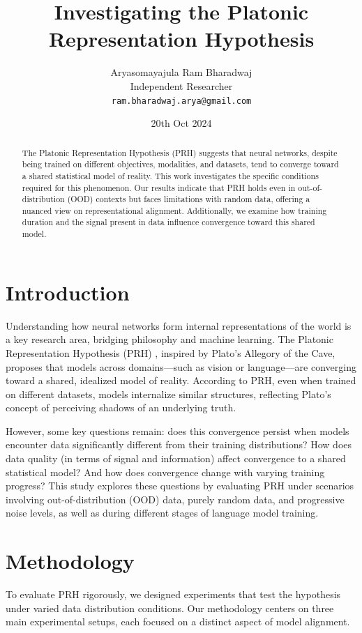 \documentclass[10pt,a4paper]{article}
\title{Investigating the Platonic Representation Hypothesis}
\author{Aryasomayajula Ram Bharadwaj\\
Independent Researcher\\
\texttt{ram.bharadwaj.arya@gmail.com}}
\date{20th Oct 2024}
\begin{document}
\maketitle

\begin{abstract}
The Platonic Representation Hypothesis (PRH) \cite{huh2024prh} suggests that neural networks, despite being trained on different objectives, modalities, and datasets, tend to converge toward a shared statistical model of reality. This work investigates the specific conditions required for this phenomenon. Our results indicate that PRH holds even in out-of-distribution (OOD) contexts but faces limitations with random data, offering a nuanced view on representational alignment. Additionally, we examine how training duration and the signal present in data influence convergence toward this shared model.
\end{abstract}

\section{Introduction}
Understanding how neural networks form internal representations of the world is a key research area, bridging philosophy and machine learning. The Platonic Representation Hypothesis (PRH) \cite{huh2024prh}, inspired by Plato’s Allegory of the Cave, proposes that models across domains—such as vision or language—are converging toward a shared, idealized model of reality. According to PRH, even when trained on different datasets, models internalize similar structures, reflecting Plato’s concept of perceiving shadows of an underlying truth.

However, some key questions remain: does this convergence persist when models encounter data significantly different from their training distributions? How does data quality (in terms of signal and information) affect convergence to a shared statistical model? And how does convergence change with varying training progress? This study explores these questions by evaluating PRH under scenarios involving out-of-distribution (OOD) data, purely random data, and progressive noise levels, as well as during different stages of language model training.

\section{Methodology}
To evaluate PRH rigorously, we designed experiments that test the hypothesis under varied data distribution conditions. Our methodology centers on three main experimental setups, each focused on a distinct aspect of model alignment.
\end{document}
